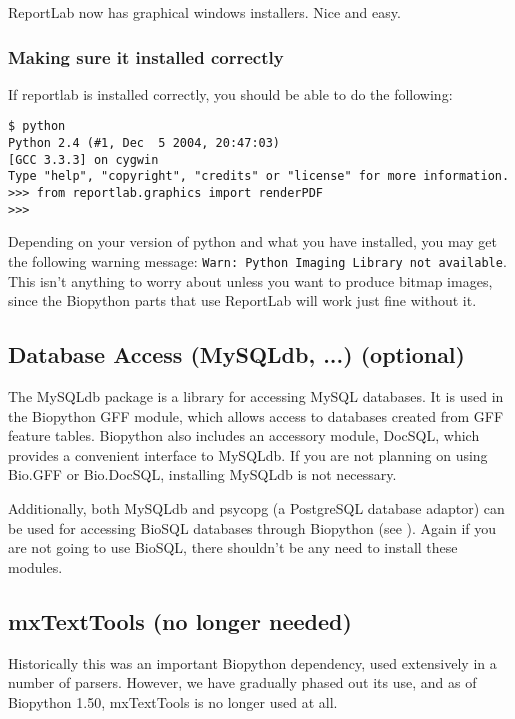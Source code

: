\documentclass{article}
\begin{document}
ReportLab now has graphical windows installers.  Nice and easy.

\subsubsection{Making sure it installed correctly}

If reportlab is installed correctly, you should be able to do the
following:

\begin{verbatim}
$ python
Python 2.4 (#1, Dec  5 2004, 20:47:03)
[GCC 3.3.3] on cygwin
Type "help", "copyright", "credits" or "license" for more information.
>>> from reportlab.graphics import renderPDF
>>>
\end{verbatim}

Depending on your version of python and what you have installed, you may
get the following warning message: 
\verb|Warn: Python Imaging Library not available|.  This isn't anything
to worry about unless you want to produce bitmap images, since the
Biopython parts that use ReportLab will work just fine without it.

\subsection{Database Access (MySQLdb, ...) (optional)}

The MySQLdb package is a library for accessing MySQL databases. It is
used in the Biopython GFF module, which allows access to databases
created from GFF feature tables. Biopython also includes an accessory
module, DocSQL, which provides a convenient interface to MySQLdb. 
If you are not planning on using Bio.GFF or Bio.DocSQL, installing
MySQLdb is not necessary.

Additionally, both MySQLdb and psycopg (a PostgreSQL database adaptor)
can be used for accessing BioSQL databases through Biopython
(see ). Again if
you are not going to use BioSQL, there shouldn't be any need to install
these modules.

\subsection{mxTextTools (no longer needed)}

Historically this was an important Biopython dependency, used extensively
in a number of parsers.  However, we have gradually phased out its use,
and as of Biopython 1.50, mxTextTools is no longer used at all.
\end{document}

